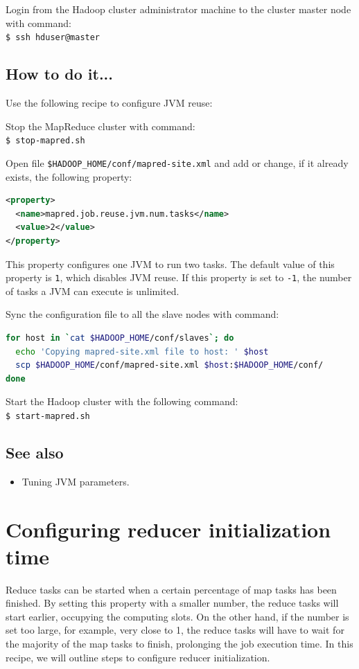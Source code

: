 Login from the Hadoop cluster administrator machine to the cluster master node with command: \\
\verb|$ ssh hduser@master|
\subsection*{How to do it...}
Use the following recipe to configure JVM reuse:

Stop the MapReduce cluster with command:\\
\verb|$ stop-mapred.sh|

Open file \verb|$HADOOP_HOME/conf/mapred-site.xml| and add or change, if it already exists, the following property:
\lstset{style=bashstyle}
\begin{lstlisting}[language=XML]
<property>
  <name>mapred.job.reuse.jvm.num.tasks</name>
  <value>2</value>
</property>
\end{lstlisting}

This property configures one JVM to run two tasks. The default value of this property is \verb|1|, which disables JVM reuse. If this property is set to \verb|-1|, the number of tasks a JVM can execute is unlimited.

Sync the configuration file to all the slave nodes with command:
\lstset{style=bashstyle}
\begin{lstlisting}[language=bash]
for host in `cat $HADOOP_HOME/conf/slaves`; do
  echo 'Copying mapred-site.xml file to host: ' $host
  scp $HADOOP_HOME/conf/mapred-site.xml $host:$HADOOP_HOME/conf/
done
\end{lstlisting}

Start the Hadoop cluster with the following command: \\
\verb|$ start-mapred.sh|

\subsection*{See also}
\begin{itemize}
  \item Tuning JVM parameters.
\end{itemize}
\section{Configuring reducer initialization time}
Reduce tasks can be started when a certain percentage of map tasks has been finished. By setting this property with a smaller number, the reduce tasks will start earlier, occupying the computing slots. On the other hand, if the number is set too large, for example, very close to 1, the reduce tasks will have to wait for the majority of the map tasks to finish, prolonging the job execution time. In this recipe, we will outline steps to configure reducer initialization.
